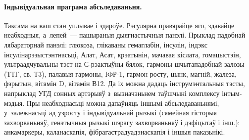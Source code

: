 \paragraph{Індывідуальная праграма абсьледаваньня.}
Таксама на ваш стан уплывае і здароўе. Рэгулярна правярайце яго, здавайце неабходныя, а~лепей~--- пашыраныя дыягнастычныя панэлі. Прыклад падобнай лябараторнай панэлі: глюкоза, глікаваны гемаглабін, інсулін, індэкс інсулінарэзыстэнтнасьці, Алат, Асат, крэатынін, мачавая кіслата, гомацыстэін, ультраадчувальны тэст на С-рэактыўны бялок, гармоны шчытападобнай залозы (ТТГ, св. Т3), палавыя гармоны, ІФР-1, гармон росту, цынк, магній, жалеза, фэрытын, вітамін D, вітамін В12. Да іх можна дадаць інструмэнтальныя тэсты, напрыклад УГД сонных артэрыяў з~вызначэньнем таўшчыні комплексу інтым-мэдыя. Пры неабходнасьці можна дапаўняць іншымі абсьледаваньнямі, у~залежнасьці ад узросту і індывідуальнай рызыкі (сямейная гісторыя захворваньняў, генэтычныя рызыкі шэрагу захворваньняў і дэфіцытаў і інш.): анкамаркеры, каланаскапія, фібрагастрадуадэнаскапія і іншыя паказьнікі.
